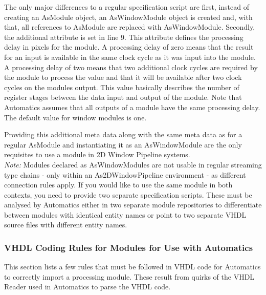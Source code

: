 The only major differences to a regular specification script are first, instead of creating an AsModule object, an AsWindowModule object is created and, with that, all references to AsModule are replaced with AsWindowModule.
Secondly, the additional attribute  is set in line 9.
This attribute defines the processing delay in pixels for the module.
A processing delay of zero means that the result for an input is available in the same clock cycle as it was input into the module.
A processing delay of two means that two additional clock cycles are required by the module to process the value and that it will be available after two clock cycles on the modules output.
This value basically describes the number of register stages between the data input and output of the module.
Note that Automatics assumes that all outputs of a module have the same processing delay.
The default value for window modules is one.

Providing this additional meta data along with the same meta data as for a regular AsModule and instantiating it as an AsWindowModule are the only requisites to use a module in 2D Window Pipeline systems.\\

\emph{Note:} Modules declared as AsWindowModules are not usable in regular streaming type chains - only within an As2DWindowPipeline environment - as different connection rules apply. If you would like to use the same module in both contexts, you need to provide two separate specification scripts.
These must be analysed by Automatics either in two separate module repositories to differentiate between modules with identical entity names or point to two separate VHDL source files with different entity names.

\subsubsection{VHDL Coding Rules for \asterics Modules for Use with Automatics}
\label{sec:06-02-vhdl_quirks}

This section lists a few rules that must be followed in VHDL code for Automatics to correctly import a processing module.
These result from quirks of the VHDL Reader used in Automatics to parse the VHDL code.

